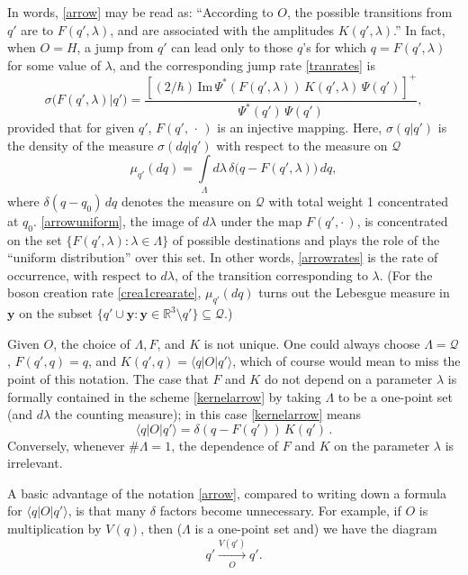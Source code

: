 \documentclass[12pt]{article}
\newcommand{\RRR}{\mathbb{R}} %
\newcommand{\1}{\mathbf{1}} %
\renewcommand{\Im}{\mathrm{Im}} %
\renewcommand{\sp}[2]{\langle #1 | #2 \rangle} %
\newcommand{\conf}{\mathcal{Q}} %
\newcommand{\vy}{{\boldsymbol y}}
\begin{document}
In words, \eqref{arrow} may be read as: ``According to $O$, the
possible transitions from $q'$ are to $F(q',\lambda)$, and are
associated with the amplitudes $K(q',\lambda)$.'' In fact, when $O =
H$, a jump from $q'$ can lead only to those $q$'s for which $q =
F(q',\lambda)$ for some value of $\lambda$, and the corresponding jump
rate \eqref{tranrates} is
\begin{equation}\label{arrowrates}
   \sigma\big(F(q',\lambda)\big|q'\big) = \frac{[(2/\hbar) \, \Im \,
   \Psi^*(F(q',\lambda)) \, K(q',\lambda) \, \Psi(q')]^+} {\Psi^*(q')
   \, \Psi(q')},
\end{equation}
provided that for given $q'$, $F(q', \,\cdot\,)$ is an injective
mapping.  Here, $\sigma(q|q')$ is the density of the measure
$\sigma(dq|q')$ with respect to the measure on $\conf$
\begin{equation}\label{arrowuniform}
   \mu_{q'}(dq) = \int\limits_{\Lambda} d\lambda \, \delta\big(
   q-F(q',\lambda) \big) \, dq,
\end{equation}
where $\delta(q-q_0) \, dq$ denotes the measure on $\conf$ with total
weight 1 concentrated at $q_0$. \eqref{arrowuniform}, the image of
$d\lambda$ under the map $F(q',\cdot\,)$,  is concentrated on the set 
$\{
F(q',\lambda) : \lambda \in \Lambda\}$ of possible destinations and 
plays
the role of the ``uniform distribution''  over this set. In other words,
\eqref{arrowrates} is the rate of occurrence, with respect to 
$d\lambda$,
of the transition corresponding to $\lambda$.  (For the boson creation
rate \eqref{crea1crearate}, $\mu_{q'}(dq)$ turns out the Lebesgue 
measure
in $\vy$ on the subset $\{q' \cup \vy: \vy \in \RRR^3 \setminus q'\}
\subseteq \conf$.)

Given $O$, the choice of $\Lambda, F$, and $K$ is not unique. One
could always choose $\Lambda = \conf$, $F(q',q) = q$, and $K(q',q) =
\sp{q}{O|q'}$, which of course would mean to miss the point of this
notation.  The case that $F$ and $K$ do not depend on a parameter
$\lambda$ is formally contained in the scheme \eqref{kernelarrow} by
taking $\Lambda$ to be a one-point set (and $d\lambda$ the counting
measure); in this case \eqref{kernelarrow} means
\begin{equation}\label{kernelarrownolambda}
   \sp{q}{O|q'} = \delta(q-F(q')) \, K(q')\,.
\end{equation}
Conversely, whenever $\# \Lambda =1$, the dependence of $F$ and $K$ on
the parameter $\lambda$ is irrelevant.

A basic advantage of the notation \eqref{arrow}, compared to writing
down a formula for $\sp{q}{O|q'}$, is that many $\delta$ factors
become unnecessary.  For example,  if $O$ is  multiplication  by
$V(q)$, then ($\Lambda$ is a one-point set and) we have the diagram
\[
   q' \xrightarrow[O]{V(q')} q'.
\]
\end{document}
